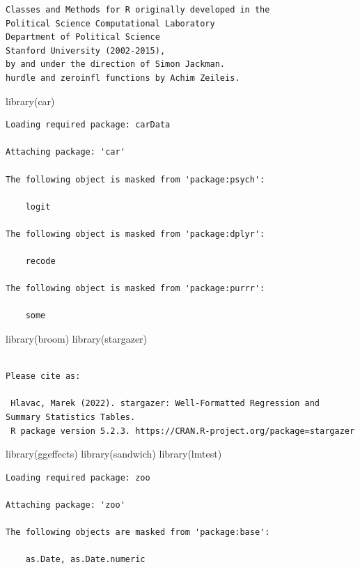 \documentclass[
  letterpaper,
  DIV=11,
  numbers=noendperiod]{scrartcl}
\newenvironment{Shaded}{\begin{snugshade}}{\end{snugshade}}
\newcommand{\FunctionTok}[1]{\textcolor[rgb]{0.28,0.35,0.67}{#1}}
\newcommand{\NormalTok}[1]{\textcolor[rgb]{0.00,0.23,0.31}{#1}}
\begin{document}
\begin{verbatim}
Classes and Methods for R originally developed in the
Political Science Computational Laboratory
Department of Political Science
Stanford University (2002-2015),
by and under the direction of Simon Jackman.
hurdle and zeroinfl functions by Achim Zeileis.
\end{verbatim}

\begin{Shaded}
\begin{Highlighting}[]
\FunctionTok{library}\NormalTok{(car)}
\end{Highlighting}
\end{Shaded}

\begin{verbatim}
Loading required package: carData

Attaching package: 'car'

The following object is masked from 'package:psych':

    logit

The following object is masked from 'package:dplyr':

    recode

The following object is masked from 'package:purrr':

    some
\end{verbatim}

\begin{Shaded}
\begin{Highlighting}[]
\FunctionTok{library}\NormalTok{(broom)}
\FunctionTok{library}\NormalTok{(stargazer)}
\end{Highlighting}
\end{Shaded}

\begin{verbatim}

Please cite as: 

 Hlavac, Marek (2022). stargazer: Well-Formatted Regression and Summary Statistics Tables.
 R package version 5.2.3. https://CRAN.R-project.org/package=stargazer 
\end{verbatim}

\begin{Shaded}
\begin{Highlighting}[]
\FunctionTok{library}\NormalTok{(ggeffects)}
\FunctionTok{library}\NormalTok{(sandwich)}
\FunctionTok{library}\NormalTok{(lmtest)}
\end{Highlighting}
\end{Shaded}

\begin{verbatim}
Loading required package: zoo

Attaching package: 'zoo'

The following objects are masked from 'package:base':

    as.Date, as.Date.numeric
\end{verbatim}
\end{document}
